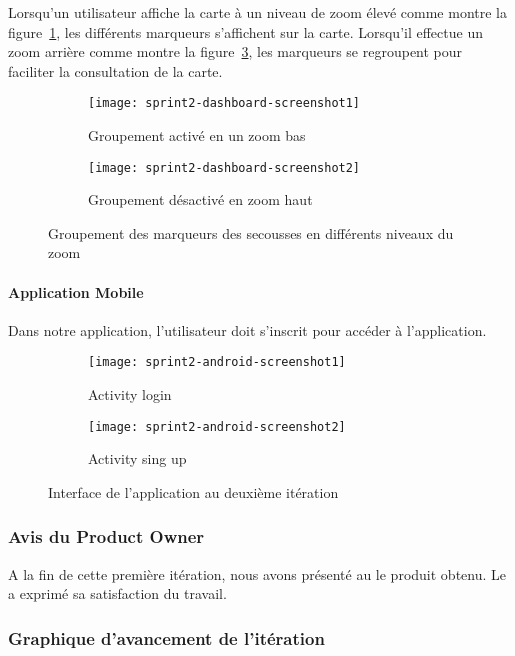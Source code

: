 Lorsqu'un utilisateur affiche la carte à un niveau de zoom élevé comme montre
la figure~\ref{fig:sprint2-dashboard-screenshot1}, les différents marqueurs
s'affichent sur la carte. Lorsqu'il effectue un zoom arrière comme montre la
figure~\ref{fig:sprint2-dashboard-screenshot2}, les marqueurs se regroupent
pour faciliter la consultation de la carte.

\begin{figure}[htbp]
    \begin{subfigure}{.5\textwidth}
        \centering
        \texttt{[image: sprint2-dashboard-screenshot1]}
        \caption{Groupement activé en un zoom bas}
        \label{fig:sprint2-dashboard-screenshot1}
    \end{subfigure}
    \begin{subfigure}{.5\textwidth}
        \centering
        \texttt{[image: sprint2-dashboard-screenshot2]}
        \caption{Groupement désactivé en zoom haut}
        \label{fig:sprint2-dashboard-screenshot2}
    \end{subfigure}
    \caption{Groupement des marqueurs des secousses en différents niveaux du zoom}
\end{figure}
\clearpage

\paragraph{Application Mobile }

Dans notre application, l'utilisateur doit s'inscrit pour accéder à
l'application.


\begin{figure}[htbp]
    \begin{subfigure}{.5\textwidth}
    \centering
  \centering
  \texttt{[image: sprint2-android-screenshot1]}
  \caption{Activity login}
  \label{fig:sprint2-android-screenshot1}
\end{subfigure}
\begin{subfigure}{.5\textwidth}
    \centering
  \centering
  \texttt{[image: sprint2-android-screenshot2]}
  \caption{Activity sing up}
  \label{fig:sprint2-android-screenshot2}
\end{subfigure}
\caption{Interface de l'application au deuxième itération}
\end{figure}

\subsubsection{Avis du Product Owner}

A la fin de cette première itération, nous avons présenté au  le produit obtenu. Le  a exprimé sa
satisfaction du travail.

\subsubsection{Graphique d'avancement de l'itération}


